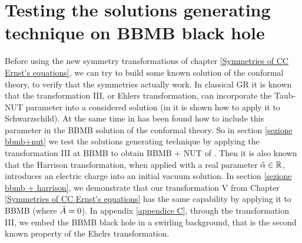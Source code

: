 


\chapter{Testing the solutions generating technique on BBMB black hole} \label{applications}
\thispagestyle{empty}
Before using the new symmetry transformations of chapter \ref{Symmetries of CC Ernst's equations}, we can try to build some known solution of the conformal theory, to verify that the symmetries actually work. In classical GR it is known that the transformation III, or Ehlers transformation, can incorporate the Taub-NUT parameter into a considered solution (in \citep{Martelli} it is shown how to apply it to Schwarzschild). At the same time in \citep{Caldarelli_Charmousis} has been found how to include this parameter in the BBMB solution of the conformal theory. So in section \ref{sezione bbmb+nut} we test the solutions generating technique by applying the transformation III at BBMB to obtain BBMB + NUT of \citep{Caldarelli_Charmousis}. 
Then it is also known that the Harrison transformation, when applied with a real parameter $\Tilde{\alpha} \in \mathbb{R}$, introduces an electric charge into an initial vacuum solution. In section \ref{sezione bbmb + harrison}, we demonstrate that our transformation V from Chapter \ref{Symmetries of CC Ernst's equations} has the same capability by applying it to BBMB (where $\Bar{A} = 0$). In appendix \ref{appendice C}, through the transformation III, we embed the BBMB black hole in a swirling background, that is the second known property of the Ehelrs transformation. 

